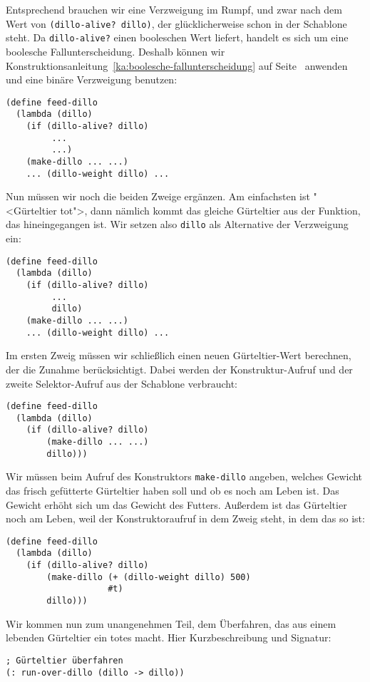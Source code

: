 Entsprechend brauchen wir eine Verzweigung im Rumpf, und zwar nach dem
Wert von \lstinline{(dillo-alive? dillo)}, der glücklicherweise schon in der
Schablone steht.  Da \lstinline{dillo-alive?} einen booleschen Wert
liefert, handelt es sich um eine boolesche Fallunterscheidung.
Deshalb 
können wir Konstruktionsanleitung~\ref{ka:boolesche-fallunterscheidung}
auf Seite~\pageref{ka:boolesche-fallunterscheidung} anwenden und eine
binäre Verzweigung benutzen:
%
\begin{lstlisting}
(define feed-dillo
  (lambda (dillo)
    (if (dillo-alive? dillo)
         ...
         ...)
    (make-dillo ... ...)
    ... (dillo-weight dillo) ...
\end{lstlisting}
%
Nun müssen wir noch die beiden Zweige ergänzen.  Am
einfachsten ist "<Gürteltier tot">, dann nämlich kommt
das gleiche Gürteltier aus der Funktion, das hineingegangen ist.  Wir
setzen also \lstinline{dillo} als Alternative der Verzweigung ein:
%
\begin{lstlisting}
(define feed-dillo
  (lambda (dillo)
    (if (dillo-alive? dillo)
         ...
         dillo)
    (make-dillo ... ...)
    ... (dillo-weight dillo) ...
\end{lstlisting}
%
Im ersten Zweig müssen wir schließlich einen neuen Gürteltier-Wert
berechnen, der die Zunahme berücksichtigt.  Dabei werden der
Konstruktur-Aufruf und der zweite Selektor-Aufruf aus der Schablone
verbraucht:
\begin{lstlisting}
(define feed-dillo
  (lambda (dillo)
    (if (dillo-alive? dillo)
        (make-dillo ... ...)
        dillo)))
\end{lstlisting}
%
Wir müssen beim Aufruf des Konstruktors \lstinline{make-dillo} angeben,
welches Gewicht das frisch gefütterte Gürteltier haben soll und ob es
noch am Leben ist.  Das Gewicht erhöht sich um das Gewicht des
Futters.  Außerdem ist das Gürteltier noch am Leben, weil der
Konstruktoraufruf in dem Zweig steht, in dem das so ist:
%
\begin{lstlisting}
(define feed-dillo
  (lambda (dillo)
    (if (dillo-alive? dillo)
        (make-dillo (+ (dillo-weight dillo) 500)
                    #t)
        dillo)))
\end{lstlisting}
%
Wir kommen nun zum unangenehmen Teil, dem Überfahren, das aus einem
lebenden Gürteltier ein totes macht.  Hier Kurzbeschreibung und
Signatur:\label{page:run-over-dillo}
%
\begin{lstlisting}
; Gürteltier überfahren
(: run-over-dillo (dillo -> dillo))
\end{lstlisting}
